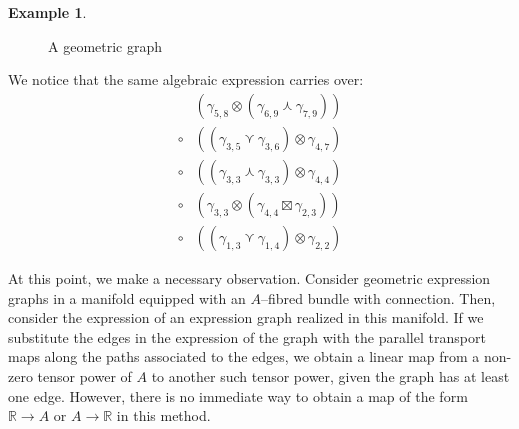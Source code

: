 \documentclass{amsart}
\newcommand{\R}{\mathbb{R}}
\newcommand{\tensor}{\otimes}
\newcommand{\cwedge}{\curlywedge}
\newcommand{\cvee}{\curlyvee}
\renewcommand{\to}[1][]{\stackrel{#1}{\longrightarrow}}
\numberwithin{thm}{section}
\theoremstyle{definition}
\newtheorem{exm}[thm]{Example}
\begin{document}
\begin{exm}
\begin{figure}[H]
\begin{center}

\end{center}
\caption{A geometric graph}
\end{figure}
We notice that the same algebraic expression carries over:
\begin{align*}
        & (\gamma_{5, 8} \tensor (\gamma_{6, 9} \cwedge \gamma_{7, 9})) \\
  \circ & ((\gamma_{3, 5} \cvee \gamma_{3, 6}) \tensor \gamma_{4, 7}) \\
  \circ & ((\gamma_{3, 3} \cwedge \gamma_{3, 3}) \tensor \gamma_{4, 4}) \\
  \circ & (\gamma_{3, 3} \tensor (\gamma_{4, 4} \boxtimes \gamma_{2, 3})) \\
  \circ & ((\gamma_{1, 3} \cvee \gamma_{1, 4}) \tensor \gamma_{2, 2})
\end{align*}
\end{exm}

At this point, we make a necessary observation. Consider geometric expression
graphs in a manifold equipped with an $A$--fibred bundle with connection. Then,
consider the expression of an expression graph realized in this manifold. If we
substitute the edges in the expression of the graph with the parallel transport
maps along the paths associated to the edges, we obtain a linear map from a
non-zero tensor power of $A$ to another such tensor power, given the graph has
at least one edge. However, there is no immediate way to obtain a map of the
form $\R \to A$ or $A \to \R$ in this method.
\end{document}

